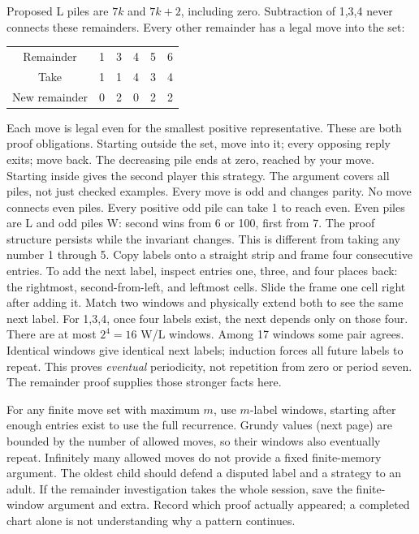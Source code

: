 \documentclass[11pt]{article}
\begin{document}
\newpage
{}
Proposed L piles are \(7k\) and \(7k+2\), including zero. Subtraction of 1,3,4 never connects these remainders. Every other remainder has a legal move into the set:
\begin{center}\renewcommand{\arraystretch}{1.45}\begin{tabular}{c|ccccc}Remainder&1&3&4&5&6\\Take&1&1&4&3&4\\New remainder&0&2&0&2&2\end{tabular}\end{center}
Each move is legal even for the smallest positive representative. These are both proof obligations. Starting outside the set, move into it; every opposing reply exits; move back. The decreasing pile ends at zero, reached by your move. Starting inside gives the second player this strategy. The argument covers all piles, not just checked examples.
Every move is odd and changes parity. No move connects even piles. Every positive odd pile can take 1 to reach even. Even piles are L and odd piles W: second wins from 6 or 100, first from 7. The proof structure persists while the invariant changes. This is different from taking any number 1 through 5.
Copy labels onto a straight strip and frame four consecutive entries. To add the next label, inspect entries one, three, and four places back: the rightmost, second-from-left, and leftmost cells. Slide the frame one cell right after adding it. Match two windows and physically extend both to see the same next label. For 1,3,4, once four labels exist, the next depends only on those four. There are at most \(2^4=16\) W/L windows. Among 17 windows some pair agrees. Identical windows give identical next labels; induction forces all future labels to repeat. This proves \emph{eventual} periodicity, not repetition from zero or period seven. The remainder proof supplies those stronger facts here.

For any finite move set with maximum \(m\), use \(m\)-label windows, starting after enough entries exist to use the full recurrence. Grundy values (next page) are bounded by the number of allowed moves, so their windows also eventually repeat. Infinitely many allowed moves do not provide a fixed finite-memory argument.
The oldest child should defend a disputed label and a strategy to an adult. If the remainder investigation takes the whole session, save the finite-window argument and extra. Record which proof actually appeared; a completed chart alone is not understanding why a pattern continues.
\end{document}
